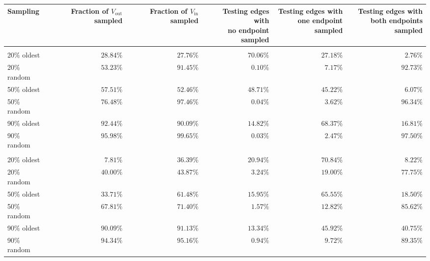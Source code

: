 \begin{table}[htpb]
  \small
  \caption[The effect of not sampling edges at random]{The effect of not sampling edges at random on
  \wik{} and \epi{}. In case of random sampling, all values are averaged over 20 trials.
  Refer to the main text for an interpretation of how this affects the predictive performance.
\label{tab:troll_early_sampling}}
  \begin{longtable}{lrrrrr}
    \toprule
    Sampling &  \thead{Fraction of\\ $V_{\mathrm{out}}$ sampled} &
    \thead{Fraction of\\ $V_{\mathrm{in}}$ sampled} &
    \thead{Testing edges with\\ no endpoint sampled} &
    \thead{Testing edges with\\ one endpoint sampled} &
    \thead{Testing edges with\\ both endpoints sampled} \\
    \midrule
    & \multicolumn{5}{c}{\wik{}} \\
    \cmidrule(lr){2-6}
    20\% oldest & $28.84\%$ & $27.76\%$ & $70.06\%$ & $27.18\%$ & $2.76\%$  \\
    20\% random & $53.23\%$ & $91.45\%$ & $0.10\%$  & $7.17\%$  & $92.73\%$ \\
    \midrule
    50\% oldest & $57.51\%$ & $52.46\%$ & $48.71\%$ & $45.22\%$ & $6.07\%$  \\
    50\% random & $76.48\%$ & $97.46\%$ & $0.04\%$  & $3.62\%$  & $96.34\%$ \\
    \midrule
    90\% oldest & $92.44\%$ & $90.09\%$ & $14.82\%$ & $68.37\%$ & $16.81\%$ \\
    90\% random & $95.98\%$ & $99.65\%$ & $0.03\%$  & $2.47\%$  & $97.50\%$ \\
    & \multicolumn{5}{c}{\epi{}} \\
    \cmidrule(lr){2-6}
    20\% oldest & $7.81\%$  & $36.39\%$ & $20.94\%$ & $70.84\%$ & $8.22\%$  \\
    20\% random & $40.00\%$ & $43.87\%$ & $3.24\%$  & $19.00\%$ & $77.75\%$ \\
    \midrule
    50\% oldest & $33.71\%$ & $61.48\%$ & $15.95\%$ & $65.55\%$ & $18.50\%$ \\
    50\% random & $67.81\%$ & $71.40\%$ & $1.57\%$  & $12.82\%$ & $85.62\%$ \\
    \midrule
    90\% oldest & $90.09\%$ & $91.13\%$ & $13.34\%$ & $45.92\%$ & $40.75\%$ \\
    90\% random & $94.34\%$ & $95.16\%$ & $0.94\%$  & $9.72\%$  & $89.35\%$ \\
    \bottomrule
  \end{longtable}
\end{table}

